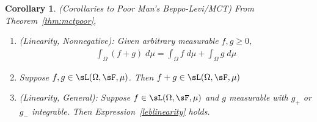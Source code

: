 \documentclass[12pt]{article}
\theoremstyle{plain}
\newtheorem{cor}[thm]{Corollary}
\theoremstyle{definition}
\theoremstyle{remark}
\begin{document}
\begin{cor}\emph{(Corollaries to Poor Man's Beppo-Levi/MCT)}
\label{cor:mctpoor}
From Theorem~\ref{thm:mctpoor},
\begin{enumerate}[label=\emph{(\roman*)}]
  \item \emph{(Linearity, Nonnegative):} Given arbitrary measurable
    $f,g\geq 0$,
    \begin{align}
      \int_\Omega (f+g)\;d\mu
      = \int_\Omega f\;d\mu
      + \int_\Omega g\;d\mu
      \label{leblinearity}
    \end{align}
  \item Suppose $f,g\in\sL(\Omega,\sF,\mu)$. Then
    $f+g\in\sL(\Omega,\sF,\mu)$
  \item \emph{(Linearity, General):}
    Suppose $f\in\sL(\Omega,\sF,\mu)$ and $g$ measurable with
    $g_+$ or $g_-$ integrable. Then Expression~\ref{leblinearity} holds.
\end{enumerate}
\end{cor}
\end{document}
